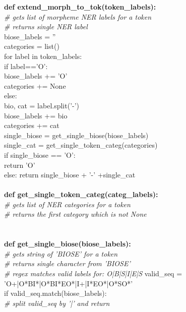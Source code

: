 \documentclass[11pt,a4paper]{article}
\begin{document}
\begin{figure}[t]
\textbf{def extend\_morph\_to\_tok(token\_labels):}\\
\emph{\# gets list of morpheme NER labels for a token}\\
\emph{\# returns single NER label}\\
\indent biose\_labels = ''\\
\indent categories = list()\\
\indent for label in token\_labels:\\
\indent \indent if label=='O': \\
\indent \indent \indent biose\_labels += 'O' \\
\indent \indent \indent categories += None \\
\indent \indent else: \\
\indent \indent \indent bio, cat = label.split('-') \\
\indent \indent \indent biose\_labels += bio\\
\indent \indent \indent categories += cat\\
\indent single\_biose = get\_single\_biose(biose\_labels)\\
\indent single\_cat = get\_single\_token\_categ(categories)\\
\indent if single\_biose == 'O':\\
\indent \indent return 'O'\\
\indent else:
\indent return single\_biose + '-' +single\_cat \\\\
\textbf{def get\_single\_token\_categ(categ\_labels):}\\ 
\emph{\# gets list of NER categories for a token}\\
\emph{\# returns the first category which is not None }\\
\indent [...]\\\\
\textbf{def get\_single\_biose(biose\_labels):}\\ 
\emph{\# gets string of 'BIOSE' for a token}\\
\emph{\# returns single character from 'BIOSE'}\\
\indent \emph{\# regex matches valid labels for: O|B|S|I|E|S}
\indent valid\_seq = {\footnotesize 'O+|O*BI*|O*BI*EO*|I+|I*EO*|O*SO*'}\\
\indent if valid\_seq.match(biose\_labels):\\
\indent \indent \emph{\# split valid\_seq by '|' and return} \\

\end{figure}
\end{document}
